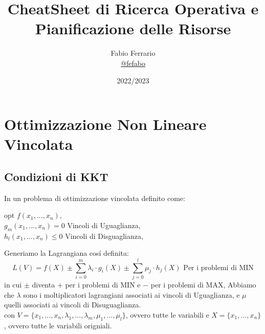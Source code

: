 \documentclass[12pt, a4paper, openany]{book}
\begin{document}
\title{CheatSheet di Ricerca Operativa e Pianificazione delle Risorse}

\author{
	Fabio Ferrario\\
	\small{\href{https://t.me/fefabo}{@fefabo}}
}
\date{2022/2023}

\maketitle

\tableofcontents

\chapter{Ottimizzazione Non Lineare Vincolata}
\section{Condizioni di KKT}
In un problema di ottimizzazione vincolata definito come:
\begin{center}
    opt $f(x_1,...,x_n)$,
    \\
    $g_m(x_1,...,x_n) = 0$ Vincoli di Uguaglianza,
    \\
    $h_l(x_1,...,x_n) \leq 0$ Vincoli di Disguaglianza,
\end{center}
Generiamo la Lagrangiana cosí definita:
\[
    L(V) = f(X) \pm \sum_{i=0}^{m} \lambda_i \cdot g_i(X) \pm \sum_{j=0}^{l} \mu_j \cdot h_j(X) \text{ Per i problemi di MIN}
\]
in cui $\pm$ diventa $+$ per i problemi di MIN e $-$ per i problemi di MAX, 
Abbiamo che $\lambda$ sono i moltiplicatori lagrangiani associati ai vincoli di Uguaglianza, e $\mu$ quelli associati ai vincoli di Disuguaglianza.
\\\small{con $V=\{x_1,...,x_n,\lambda_1,...,\lambda_m, \mu_1,...,\mu_l\}$, ovvero tutte le variabili e $X=\{x_1,...,x_n\}$, ovvero tutte le variabili origniali.}
\end{document}

